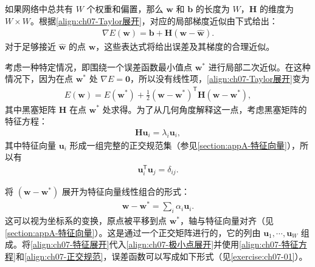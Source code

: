 \documentclass[../../main.tex]{subfiles}
\begin{document}
如果网络中总共有 $W$ 个权重和偏置，那么 $\mathbf{w}$ 和 $\mathbf{b}$ 的长度为 $W$，$\mathbf{H}$ 的维度为 $W\times W$。根据\eqref{align:ch07-Taylor展开}，对应的局部梯度近似由下式给出：
\begin{align}
\nabla E(\mathbf{w}) = \mathbf{b}+\mathbf{H}(\mathbf{w}-\hat{\mathbf{w}}).
\label{align:ch07-梯度近似}
\end{align}
对于足够接近 $\hat{\mathbf{w}}$ 的点 $\mathbf{w}$，这些表达式将给出误差及其梯度的合理近似。

考虑一种特定情况，即围绕一个误差函数最小值点 $\mathbf{w}^{\ast}$ 进行局部二次近似。在这种情况下，因为在点 $\mathbf{w}^{\ast}$ 处 $\nabla E=\mathbf{0}$，所以没有线性项，\eqref{align:ch07-Taylor展开}变为
\begin{align}
E(\mathbf{w}) = E(\mathbf{w}^{\ast})+\frac{1}{2}(\mathbf{w}-\mathbf{w}^{\ast})^{\mathsf T}\mathbf{H}(\mathbf{w}-\mathbf{w}^{\ast}),
\label{align:ch07-极小点展开}
\end{align}
其中黑塞矩阵 $\mathbf{H}$ 在点 $\mathbf{w}^{\ast}$ 处求得。为了从几何角度解释这一点，考虑黑塞矩阵的特征方程：
\begin{align}
\mathbf{H}\mathbf{u}_i = \lambda_i\mathbf{u}_i,
\label{align:ch07-特征方程}
\end{align}
其中特征向量 $\mathbf{u}_i$ 形成一组完整的正交规范集（参见\cref{section:appA-特征向量}），所以有
\begin{align}
\mathbf{u}_i^{\mathsf T}\mathbf{u}_j = \delta_{ij}.
\label{align:ch07-正交规范}
\end{align}

将 $(\mathbf{w}-\mathbf{w}^{\ast})$ 展开为特征向量线性组合的形式：
\begin{align}
\mathbf{w}-\mathbf{w}^{\ast} = \sum_i \alpha_i\mathbf{u}_i.
\label{align:ch07-特征展开}
\end{align}
这可以视为坐标系的变换，原点被平移到点 $\mathbf{w}^{\ast}$，轴与特征向量对齐（见\cref{section:appA-特征向量}）。这是通过一个正交矩阵进行的，它的列由 $\mathbf{u}_1,\cdots,\mathbf{u}_W$ 组成。将\eqref{align:ch07-特征展开}代入\eqref{align:ch07-极小点展开}并使用\eqref{align:ch07-特征方程}和\eqref{align:ch07-正交规范}，误差函数可以写成如下形式（见\cref{exercise:ch07-01}）。
\end{document}
